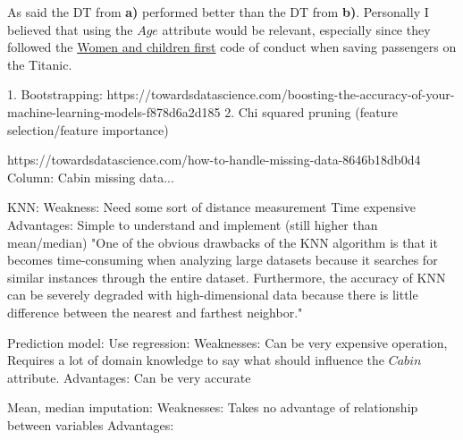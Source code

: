 \documentclass[11pt, english]{../Template/NTNUoving}
\begin{document}
\begin{oppgave}
\begin{punkt}
    \end{punkt}

    \begin{punkt}
        As said the DT from \textbf{a)} performed better than the DT from \textbf{b)}. Personally I believed that
        using the $Age$ attribute would be relevant, especially since they followed the \href{https://en.wikipedia.org/wiki/Women_and_children_first}{Women and children first}
        code of conduct when saving passengers on the Titanic.

        1. Bootstrapping: https://towardsdatascience.com/boosting-the-accuracy-of-your-machine-learning-models-f878d6a2d185
        2. Chi squared pruning (feature selection/feature importance)
    \end{punkt}
\end{oppgave}

\begin{oppgave}
    https://towardsdatascience.com/how-to-handle-missing-data-8646b18db0d4
    Column: Cabin missing data...

    KNN:
    Weakness: Need some sort of distance measurement
    Time expensive
    Advantages:
    Simple to understand and implement (still higher than mean/median)
    "One of the obvious drawbacks of the KNN algorithm is that it becomes time-consuming when analyzing large datasets because it searches for similar instances through the entire dataset. Furthermore, the accuracy of KNN can be severely degraded with high-dimensional data because there is little difference between the nearest and farthest neighbor."


    Prediction model: Use regression:
    Weaknesses: Can be very expensive operation,
    Requires a lot of domain knowledge to say what should influence the $Cabin$ attribute.
    Advantages: Can be very accurate

    Mean, median imputation:
    Weaknesses: Takes no advantage of relationship between variables
    Advantages:




\end{oppgave}
\end{document}
